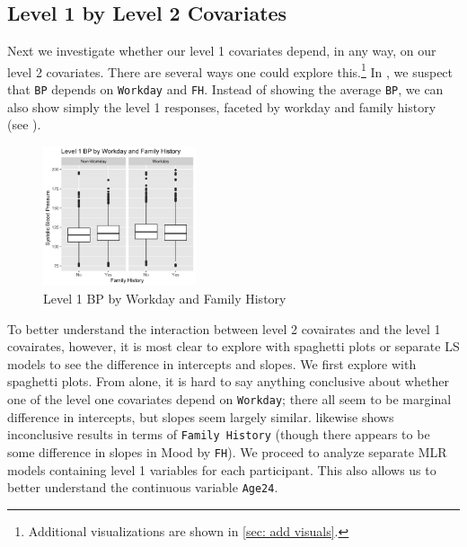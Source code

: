 \documentclass[12pt,twoside,leqno,fleqn,letterpaper]{article}
\theoremstyle{definition}
\theoremstyle{definition}
\begin{document}
\subsection{Level 1 by Level 2 Covariates}\label{sec: lv1 x lv2}

Next we investigate whether our level 1 covariates depend, in any way, on our level 2 covariates. There are several ways one could explore this.\footnote{Additional visualizations are shown in \autoref{sec: add visuals}.} In , we suspect that \texttt{BP} depends on \texttt{Workday} and \texttt{FH}. Instead of showing the average \texttt{BP}, we can also show simply the level 1 responses, faceted by workday and family history (see ).

\begin{figure} 
\centering
\includegraphics[width=0.4\textwidth]{pics/bp by day and fh.png}
\caption{Level 1 BP by Workday and Family History}
\label{fig: bp by day and fh}
\end{figure}

To better understand the interaction between level 2 covairates and the level 1 covairates, however, it is most clear to explore with spaghetti plots or separate LS models to see the difference in intercepts and slopes. We first explore with spaghetti plots. From  alone, it is hard to say anything conclusive about whether one of the level one covariates depend on \texttt{Workday}; there all seem to be marginal difference in intercepts, but slopes seem largely similar.  likewise shows inconclusive results in terms of \texttt{Family History} (though there appears to be some difference in slopes in Mood by \texttt{FH}). We proceed to analyze separate MLR models containing level 1 variables for each participant. This also allows us to better understand the continuous variable \texttt{Age24}. 
\end{document}

